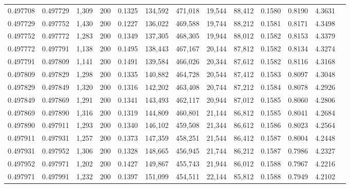\begin{tabular}{rrrrrrrrrrrrr}
0.497708 & 0.497729 & 1,309 & 200 &                                     0.1325 & 134,592 & 471,018 &  19,544 &  88,412 & 0.1580 & 0.8190 & 4.3631 \\
0.497729 & 0.497752 & 1,430 & 200 &                                     0.1227 & 136,022 & 469,588 &  19,744 &  88,212 & 0.1581 & 0.8171 & 4.3498 \\
0.497752 & 0.497772 & 1,283 & 200 &                                     0.1349 & 137,305 & 468,305 &  19,944 &  88,012 & 0.1582 & 0.8153 & 4.3379 \\
0.497772 & 0.497791 & 1,138 & 200 &                                     0.1495 & 138,443 & 467,167 &  20,144 &  87,812 & 0.1582 & 0.8134 & 4.3274 \\
0.497791 & 0.497809 & 1,141 & 200 &                                     0.1491 & 139,584 & 466,026 &  20,344 &  87,612 & 0.1582 & 0.8116 & 4.3168 \\
0.497809 & 0.497829 & 1,298 & 200 &                                     0.1335 & 140,882 & 464,728 &  20,544 &  87,412 & 0.1583 & 0.8097 & 4.3048 \\
0.497829 & 0.497849 & 1,320 & 200 &                                     0.1316 & 142,202 & 463,408 &  20,744 &  87,212 & 0.1584 & 0.8078 & 4.2926 \\
0.497849 & 0.497869 & 1,291 & 200 &                                     0.1341 & 143,493 & 462,117 &  20,944 &  87,012 & 0.1585 & 0.8060 & 4.2806 \\
0.497869 & 0.497890 & 1,316 & 200 &                                     0.1319 & 144,809 & 460,801 &  21,144 &  86,812 & 0.1585 & 0.8041 & 4.2684 \\
0.497890 & 0.497911 & 1,293 & 200 &                                     0.1340 & 146,102 & 459,508 &  21,344 &  86,612 & 0.1586 & 0.8023 & 4.2564 \\
0.497911 & 0.497931 & 1,257 & 200 &                                     0.1373 & 147,359 & 458,251 &  21,544 &  86,412 & 0.1587 & 0.8004 & 4.2448 \\
0.497931 & 0.497952 & 1,306 & 200 &                                     0.1328 & 148,665 & 456,945 &  21,744 &  86,212 & 0.1587 & 0.7986 & 4.2327 \\
0.497952 & 0.497971 & 1,202 & 200 &                                     0.1427 & 149,867 & 455,743 &  21,944 &  86,012 & 0.1588 & 0.7967 & 4.2216 \\
0.497971 & 0.497991 & 1,232 & 200 &                                     0.1397 & 151,099 & 454,511 &  22,144 &  85,812 & 0.1588 & 0.7949 & 4.2102 \\

\end{tabular}

